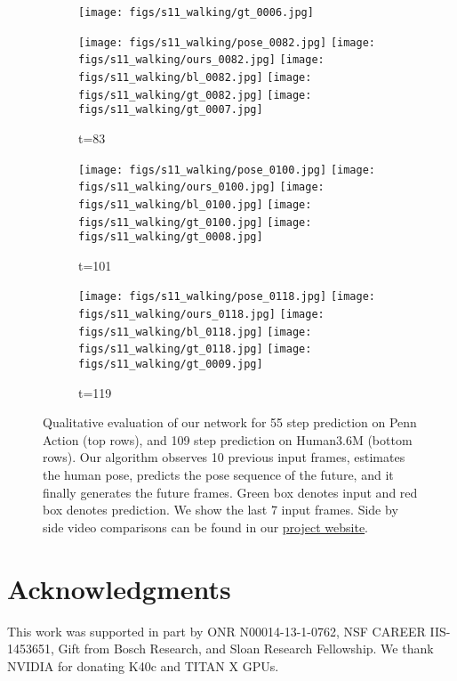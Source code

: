 \documentclass{article}
\newcommand{\cutsectionup}{\vspace*{-0.1in}}
\newcommand{\cutsectiondown}{\vspace*{-0.05in}}
\newcommand{\cutsectionup}{}
\newcommand{\cutsectiondown}{}
\begin{document}
\begin{figure*}[thbp]
\begin{subfigure}{0.12\linewidth}
  		\texttt{[image: figs/s11\_walking/gt\_0006.jpg]}
	\end{subfigure}
	\begin{subfigure}{0.12\linewidth}
        \caption*{t=83}
        \vspace{-7pt}
	    \texttt{[image: figs/s11\_walking/pose\_0082.jpg]} 
  		\texttt{[image: figs/s11\_walking/ours\_0082.jpg]}
  		\texttt{[image: figs/s11\_walking/bl\_0082.jpg]}
  		\texttt{[image: figs/s11\_walking/gt\_0082.jpg]}
  		\texttt{[image: figs/s11\_walking/gt\_0007.jpg]}
	\end{subfigure}
	\begin{subfigure}{0.12\linewidth}
        \caption*{t=101}
        \vspace{-7pt}
	    \texttt{[image: figs/s11\_walking/pose\_0100.jpg]} 
  		\texttt{[image: figs/s11\_walking/ours\_0100.jpg]}
  		\texttt{[image: figs/s11\_walking/bl\_0100.jpg]}
  		\texttt{[image: figs/s11\_walking/gt\_0100.jpg]}
  		\texttt{[image: figs/s11\_walking/gt\_0008.jpg]}
	\end{subfigure}
	\begin{subfigure}{0.12\linewidth}
        \caption*{t=119}
        \vspace{-7pt}
	    \texttt{[image: figs/s11\_walking/pose\_0118.jpg]} 
  		\texttt{[image: figs/s11\_walking/ours\_0118.jpg]}
  		\texttt{[image: figs/s11\_walking/bl\_0118.jpg]}
  		\texttt{[image: figs/s11\_walking/gt\_0118.jpg]}
  		\texttt{[image: figs/s11\_walking/gt\_0009.jpg]}
	\end{subfigure}
    \vspace{-5pt}

    \caption{Qualitative evaluation of our network for 55 step prediction on Penn Action (top rows), and 109 step prediction on Human3.6M (bottom rows). Our algorithm observes 10 previous input frames, estimates the human pose, predicts the pose sequence of the future, and it finally generates the future frames. Green box denotes input and red box denotes prediction. We show the last 7 input frames. Side by side video comparisons can be found in our \href{https://goo.gl/U7UOfy}{project website}.}
\label{fig:qualitative}
\end{figure*}

\cutsectionup\section*{Acknowledgments}\cutsectiondown
This work was supported in part by ONR N00014-13-1-0762, NSF CAREER
IIS-1453651, Gift from Bosch Research, and Sloan Research Fellowship.
We thank NVIDIA for donating K40c and TITAN X GPUs.
\end{document}
